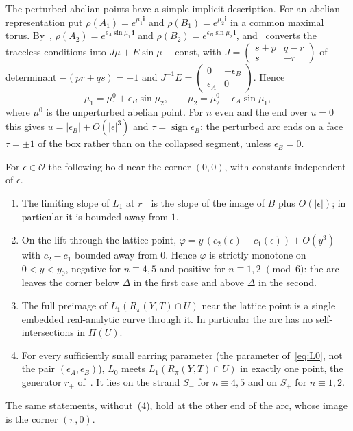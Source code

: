 \begin{remark}\label{rem:abelianpoints}
The perturbed abelian points have a simple implicit description. For an abelian representation put
$\rho(A_1)=e^{\mu_1\mathbf i}$ and $\rho(B_1)=e^{\mu_2\mathbf i}$ in a common maximal torus. By~\cite[(32)]{HHK2},
$\rho(A_2)=e^{\epsilon_A\sin\mu_1\,\mathbf i}$ and $\rho(B_2)=e^{\epsilon_B\sin\mu_2\,\mathbf i}$, and~\cite[(31)]{HHK2} converts the traceless
conditions into $J\mu+E\sin\mu\equiv\text{const}$, with $J=\begin{pmatrix}s+p&q-r\\ s&-r\end{pmatrix}$ of determinant $-(pr+qs)=-1$ and
$J^{-1}E=\begin{pmatrix}0&-\epsilon_B\\ \epsilon_A&0\end{pmatrix}$. Hence
$$\mu_1=\mu_1^0+\epsilon_B\sin\mu_2,\qquad \mu_2=\mu_2^0-\epsilon_A\sin\mu_1,$$
where $\mu^0$ is the unperturbed abelian point. For $n$ even and the end over $u=0$ this gives
$u=|\epsilon_B|+O(|\epsilon|^3)$ and $\tau=\operatorname{sign}\epsilon_B$: the perturbed arc ends on a face $\tau=\pm1$ of the box
rather than on the collapsed segment, unless $\epsilon_B=0$.
\end{remark}

\begin{corollary}\label{cor:corners}
For $\epsilon\in\mathcal O$ the following hold near the corner $(0,0)$, with constants independent of $\epsilon$.
\begin{enumerate}
\item The limiting slope of $L_1$ at $r_+$ is the slope of the image of $B$ plus $O(|\epsilon|)$; in particular it is
bounded away from $1$.
\item On the lift through the lattice point, $\varphi=y\,(c_2(\epsilon)-c_1(\epsilon))+O(y^3)$ with $c_2-c_1$ bounded away
from $0$. Hence $\varphi$ is strictly monotone on $0<y<y_0$, negative for $n\equiv4,5$ and positive for $n\equiv1,2$
$\pmod 6$: the arc leaves the corner below $\Delta$ in the first case and above $\Delta$ in the second.
\item The full preimage of $L_1(R_\pi(Y,T)\cap U)$ near the lattice point is a single embedded real-analytic
curve through it. In particular the arc has no self-intersections in $\Pi(U)$.
\item For every sufficiently small earring parameter (the parameter of~\eqref{eq:L0}, not the pair
$(\epsilon_A,\epsilon_B)$), $L_0$ meets $L_1(R_\pi(Y,T)\cap U)$ in exactly one point, the generator $r_+$ of~\cite[Lemma~5.1]{HHK2}. It lies on the strand $S_-$ for $n\equiv4,5$ and on $S_+$
for $n\equiv1,2$.
\end{enumerate}
The same statements, without~(4), hold at the other end of the arc, whose image is the corner $(\pi,0)$.
\end{corollary}


